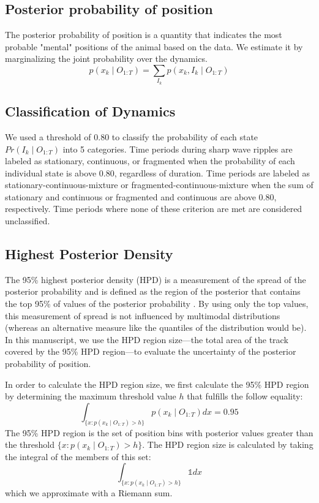 \documentclass[9pt,lineno]{elife}
\begin{document}
\subsection*{Posterior probability of position}
The posterior probability of position is a quantity that indicates the most probable "mental" positions of the animal based on the data. We estimate it by marginalizing the joint probability over the dynamics.
$$p(x_{k} \mid O_{1:T}) = \sum_{I_{k}} p(x_{k}, I_{k} \mid O_{1:T})$$

\subsection*{Classification of Dynamics}
We used a threshold of 0.80 to classify the probability of each state $Pr(I_{k} \mid O_{1:T})$ into 5 categories. Time periods during sharp wave ripples are labeled as stationary, continuous, or fragmented when the probability of each individual state is above 0.80, regardless of duration. Time periods are labeled as stationary-continuous-mixture or fragmented-continuous-mixture when the sum of stationary and continuous or fragmented and continuous are above 0.80, respectively. Time periods where none of these criterion are met are considered unclassified.

\subsection*{Highest Posterior Density}
The 95\% highest posterior density (HPD) is a measurement of the spread of the posterior probability and is defined as the region of the posterior that contains the top 95\% of values of the posterior probability \citep{CasellaStatisticalinference2001}. By using only the top values, this measurement of spread is not influenced by multimodal distributions (whereas an alternative measure like the quantiles of the distribution would be). In this manuscript, we use the HPD region size---the total area of the track covered by the 95\% HPD region---to evaluate the uncertainty of the posterior probability of position. 

In order to calculate the HPD region size, we first calculate the 95\% HPD region by determining the maximum threshold value $h$ that fulfills the follow equality:
$$
\int_{\{x: p(x_{k} \mid O_{1:T}) > h\}} p(x_{k} \mid O_{1:T})dx = 0.95
$$
The 95\% HPD region is the set of position bins with posterior values greater than the threshold $\{x : p(x_{k} \mid O_{1:T}) > h\}$. The HPD region size is calculated by taking the integral of the members of this set:
$$
\int_{\{x: p(x_{k} \mid O_{1:T}) > h\}} \mathbb{1}dx
$$
which we approximate with a Riemann sum.
\end{document}
